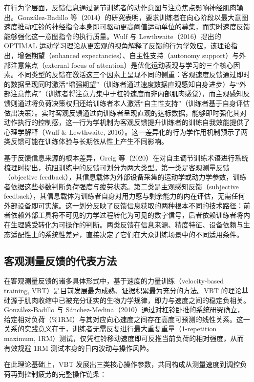 \documentclass[UTF8,zihao=-4,twoside,openany]{ctexbook}
\begin{document}
在行为学层面，反馈信息通过调节训练者的动作意图与注意焦点影响神经肌肉输出。González-Badillo 等（2014）的研究表明，要求训练者在向心阶段以最大意图速度推动杠铃的神经指令本身即可驱动更高阈值运动单位的募集，而实时速度反馈能够强化这一意图指令的执行质量。Wulf 与 Lewthwaite（2016）提出的 OPTIMAL 运动学习理论从更宏观的视角解释了反馈的行为学效应，该理论指出，增强期望（enhanced expectancies）、自主性支持（autonomy support）与外部注意焦点（external focus of attention）是优化运动表现与学习的三个核心因素。不同类型的反馈在激活这三个因素上呈现不同的侧重：客观速度反馈通过即时的数据呈现同时激活“增强期望”（训练者通过速度数据直观感知自身进步）与“外部注意焦点”（训练者将注意力集中于杠铃速度而非内部肌肉感觉），而主观感知反馈则通过将负荷决策权归还给训练者本人激活“自主性支持”（训练者基于自身评估做出决策）。实时客观反馈通过向训练者呈现直观的达标数据，能够即时强化其对动作执行的控制感，这一行为学机制为客观反馈提升训练者的训练自我效能提供了心理学解释（Wulf \& Lewthwaite, 2016）。这一差异化的行为学作用机制预示了两类反馈可能在训练体验与长期依从性上产生不同影响。

基于反馈信息来源的根本差异，Greig 等（2020）在对自主调节训练术语进行系统梳理时提出，抗阻训练中的反馈可划分为两大类型。第一类是客观测量反馈（objective feedback），其信息载体为外部设备采集的运动学或动力学参数，训练者依据这些参数判断负荷强度与疲劳状态。第二类是主观感知反馈（subjective feedback），其信息载体为训练者自身对用力感与剩余能力的内在评估，无需任何外部设备即可实施。这一划分反映了反馈信息获取的两种根本不同的技术路径：前者依赖外部工具将不可见的力学过程转化为可见的数字信号，后者依赖训练者将内在生理感受转化为可操作的判断。两类反馈在信息来源、精度特征、设备依赖与生态适配性上的系统性差异，直接决定了它们在大众训练场景中的不同适用条件。

\subsection{客观测量反馈的代表方法}
在客观测量反馈的诸多具体形式中，基于速度的力量训练（velocity-based training, VBT）是目前发展最为成熟、证据积累最为充分的方法。VBT 的理论基础源于肌肉收缩中已被充分证实的生物力学规律，即力与速度之间的稳定负相关。González-Badillo 与 Sánchez-Medina（2010）通过对杠铃卧推的系统研究确立，给定相对负荷（\%1RM）与其对应向心速度之间存在高度可预测的线性关系。这一关系的实践意义在于，训练者无需反复进行最大重复重量（1-repetition maximum, 1RM）测试，仅凭杠铃移动速度即可反推当前负荷的相对强度，从而有效规避 1RM 测试本身的日内波动与操作风险。

在此理论基础上，VBT 发展出三类核心操作参数，共同构成从测量速度到调控负荷再到控制疲劳的完整操作链条：
\end{document}
